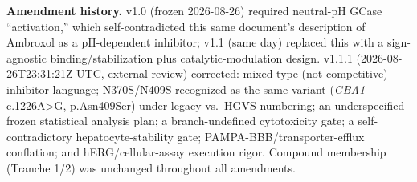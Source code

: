 \documentclass{article}
\begin{document}
\textbf{Amendment history.} v1.0 (frozen 2026-08-26) required neutral-pH GCase ``activation,'' which self-contradicted this same document's description of Ambroxol as a pH-dependent inhibitor; v1.1 (same day) replaced this with a sign-agnostic binding/stabilization plus catalytic-modulation design. v1.1.1 (2026-08-26T23:31:21Z UTC, external review) corrected: mixed-type (not competitive) inhibitor language; N370S/N409S recognized as the same variant (\textit{GBA1} c.1226A\textgreater{}G, p.Asn409Ser) under legacy vs.\ HGVS numbering; an underspecified frozen statistical analysis plan; a branch-undefined cytotoxicity gate; a self-contradictory hepatocyte-stability gate; PAMPA-BBB/transporter-efflux conflation; and hERG/cellular-assay execution rigor. Compound membership (Tranche 1/2) was unchanged throughout all amendments.
\end{document}
